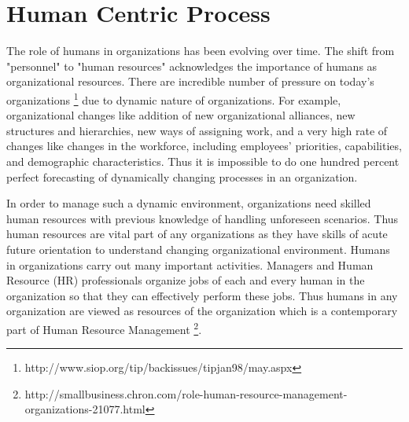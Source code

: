 \section{Human Centric Process}
\label{sec:humancentric}
The role of humans in organizations has been evolving over time. The shift from "personnel" to "human resources" acknowledges the importance of humans as organizational resources. There are incredible number of pressure on today's organizations \footnote{http://www.siop.org/tip/backissues/tipjan98/may.aspx} due to dynamic nature of organizations. For example, organizational changes like addition of new organizational alliances, new structures and hierarchies, new ways of assigning work, and a very high rate of changes like changes in the workforce, including employees' priorities, capabilities, and demographic characteristics. Thus it is impossible to do one hundred percent perfect forecasting of dynamically changing processes in an organization.

In order to manage such a dynamic environment, organizations need skilled human resources with previous knowledge of handling unforeseen scenarios. Thus human resources are vital part of any organizations as they have skills of acute future orientation to understand changing organizational environment. Humans in organizations carry out many important activities. Managers and Human Resource (HR) professionals organize jobs of each and every human in the organization so that they can effectively perform these jobs. Thus humans in any organization are viewed as resources of the organization which is a contemporary part of Human Resource Management \footnote{http://smallbusiness.chron.com/role-human-resource-management-organizations-21077.html}.

